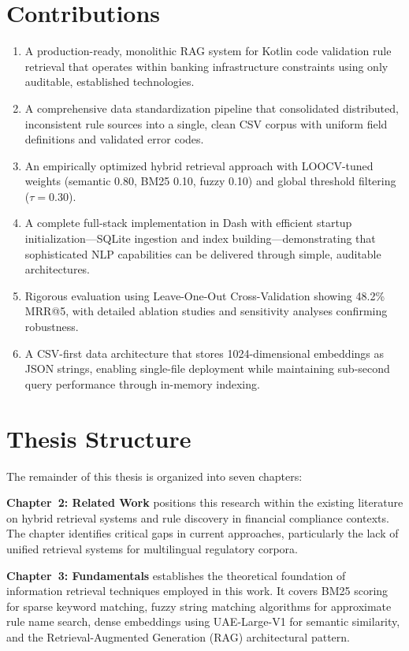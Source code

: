 \section{Contributions}
\begin{enumerate}[leftmargin=*,itemsep=2pt,topsep=2pt]
 \item A production-ready, monolithic RAG system for Kotlin code validation rule retrieval that operates within banking infrastructure constraints using only auditable, established technologies.
 \item A comprehensive data standardization pipeline that consolidated distributed, inconsistent rule sources into a single, clean CSV corpus with uniform field definitions and validated error codes.
 \item An empirically optimized hybrid retrieval approach with LOOCV-tuned weights (semantic 0.80, BM25 0.10, fuzzy 0.10) and global threshold filtering ($\tau{=}0.30$).
 \item A complete full-stack implementation in Dash with efficient startup initialization—SQLite ingestion and index building—demonstrating that sophisticated NLP capabilities can be delivered through simple, auditable architectures.
 \item Rigorous evaluation using Leave-One-Out Cross-Validation showing 48.2\% MRR@5, with detailed ablation studies and sensitivity analyses confirming robustness.
 \item A CSV-first data architecture that stores 1024-dimensional embeddings as JSON strings, enabling single-file deployment while maintaining sub-second query performance through in-memory indexing.
\end{enumerate}

\section{Thesis Structure}

The remainder of this thesis is organized into seven chapters:

\textbf{Chapter~2: Related Work} positions this research within the existing literature on hybrid retrieval systems and rule discovery in financial compliance contexts. The chapter identifies critical gaps in current approaches, particularly the lack of unified retrieval systems for multilingual regulatory corpora.

\textbf{Chapter~3: Fundamentals} establishes the theoretical foundation of information retrieval techniques employed in this work. It covers BM25 scoring for sparse keyword matching, fuzzy string matching algorithms for approximate rule name search, dense embeddings using UAE-Large-V1 for semantic similarity, and the Retrieval-Augmented Generation (RAG) architectural pattern.

